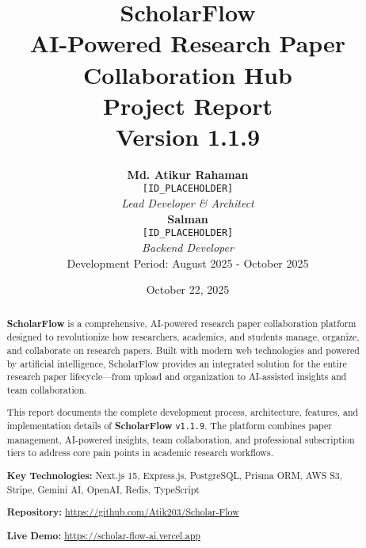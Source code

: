 \documentclass[12pt,a4paper]{report}
\title{
    \vspace{-2cm}
    {\Huge\textcolor{primaryblue}{\textbf{ScholarFlow}}}\\
    \vspace{0.5cm}
    {\Large AI-Powered Research Paper Collaboration Hub}\\
    \vspace{0.3cm}
    {\large Project Report}\\
    \vspace{0.5cm}
    {\normalsize Version 1.1.9}
}
\author{
    \textbf{Md. Atikur Rahaman}\\
    \texttt{[ID\_PLACEHOLDER]}\\
    \textit{Lead Developer \& Architect}\\[0.3cm]
    \textbf{Salman}\\
    \texttt{[ID\_PLACEHOLDER]}\\
    \textit{Backend Developer}\\[0.3cm]
    \small Development Period: August 2025 - October 2025
}
\date{October 22, 2025}
\newcommand{\projectname}{\textbf{\textcolor{primaryblue}{ScholarFlow}}}
\newcommand{\version}{\texttt{v1.1.9}}
\begin{document}
\maketitle
\thispagestyle{empty}

\newpage

\begin{abstract}
\noindent
\projectname{} is a comprehensive, AI-powered research paper collaboration platform designed to revolutionize how researchers, academics, and students manage, organize, and collaborate on research papers. Built with modern web technologies and powered by artificial intelligence, ScholarFlow provides an integrated solution for the entire research paper lifecycle—from upload and organization to AI-assisted insights and team collaboration.

\vspace{0.5cm}
\noindent
This report documents the complete development process, architecture, features, and implementation details of \projectname{} \version{}. The platform combines paper management, AI-powered insights, team collaboration, and professional subscription tiers to address core pain points in academic research workflows.

\vspace{0.5cm}
\noindent
\textbf{Key Technologies:} Next.js 15, Express.js, PostgreSQL, Prisma ORM, AWS S3, Stripe, Gemini AI, OpenAI, Redis, TypeScript

\vspace{0.3cm}
\noindent
\textbf{Repository:} \url{https://github.com/Atik203/Scholar-Flow}

\vspace{0.3cm}
\noindent
\textbf{Live Demo:} \url{https://scholar-flow-ai.vercel.app}
\end{abstract}

\newpage

\tableofcontents
\newpage

\listoffigures
\newpage

\listoftables
\newpage
















\appendix






\end{document}
